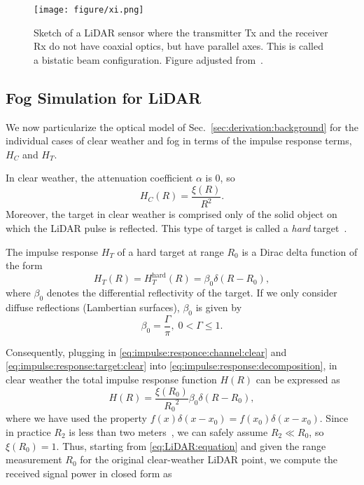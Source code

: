 \documentclass[10pt,twocolumn,letterpaper]{article}
\begin{document}
\begin{figure}
     \centering
     \texttt{[image: figure/xi.png]}
     \caption{Sketch of a LiDAR sensor where the transmitter \textsf{Tx} and the receiver \textsf{Rx} do not have coaxial optics, but have parallel axes. This is called a bistatic beam configuration. Figure adjusted from~\cite{Rasshofer_2011}.}
     \label{fig:xi}
\end{figure}

\subsection{Fog Simulation for LiDAR}
\label{sec:derivation:simulation}

We now particularize the optical model of Sec.~\ref{sec:derivation:background} for the individual cases of clear weather and fog in terms of the impulse response terms, $H_C$ and $H_T$.

In clear weather, the attenuation coefficient $\alpha$ is 0, so
\begin{equation} \label{eq:impulse:responce:channel:clear}
    H_C(R) = \frac{\xi(R)}{R^2}.
\end{equation}
Moreover, the target in clear weather is comprised only of the solid object on which the LiDAR pulse is reflected. This type of target is called a \emph{hard} target~\cite{Rasshofer_2011}. 

The impulse response $H_T$ of a hard target at range $R_0$ is a Dirac delta function of the form
\begin{equation} \label{eq:impulse:response:target:clear}
    H_T(R) = H_T^{\text{hard}}(R) = \beta_0 \delta(R-R_0),
\end{equation}
where $\beta_0$ denotes the differential reflectivity of the target. If we only consider diffuse reflections (Lambertian surfaces), $\beta_0$ is given by 
\begin{equation} \label{eq:beta_0}
    \beta_0 = \frac{\Gamma}{\pi},\;0 < \Gamma \leq 1.
\end{equation}

Consequently, plugging in \eqref{eq:impulse:responce:channel:clear} and \eqref{eq:impulse:response:target:clear} into \eqref{eq:impulse:response:decomposition}, in clear weather the total impulse response function $H(R)$ can be expressed as
\begin{equation} \label{eq:impulse:response:total:clear}
    H(R) = \frac{\xi(R_0)}{{R_0}^2} \beta_0 \delta(R-R_0),
\end{equation}
where we have used the property $f(x)\delta(x-x_0)=f(x_0)\delta(x-x_0)$. Since in practice $R_2$ is less than two meters~\cite{Velodyne}, we can safely assume $R_2 \ll R_0$, so $\xi(R_0) = 1$. Thus, starting from \eqref{eq:LiDAR:equation} and given the range measurement $R_0$ for the original clear-weather LiDAR point, we compute the received signal power in closed form as
\end{document}

